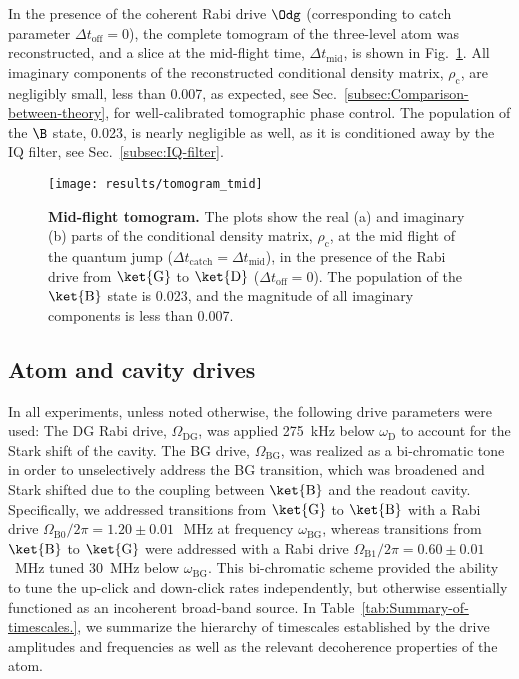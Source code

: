 In the presence of the coherent Rabi drive $\Odg$ (corresponding
to catch parameter $\Delta t_{\mathrm{off}}=0$), the complete tomogram
of the three-level atom was reconstructed, and a slice at the mid-flight
time, $\Delta t_{\mathrm{mid}}$, is shown in Fig.~\ref{fig:tomo_tmid}.
All imaginary components of the reconstructed conditional density
matrix, $\rho_{\mathrm{c}}$, are negligibly small, less than 0.007,
as expected, see Sec.~\ref{subsec:Comparison-between-theory}, for
well-calibrated tomographic phase control. The population of the $\B$
state, 0.023, is nearly negligible as well, as it is conditioned away
by the IQ filter, see Sec.~\ref{subsec:IQ-filter}.
\begin{figure}
\centering{}\texttt{[image: results/tomogram\_tmid]}
\caption[Mid-flight tomogram]{\label{fig:tomo_tmid}\textbf{Mid-flight tomogram. }The plots show
the real (a) and imaginary (b) parts of the conditional density matrix,
$\rho_{\mathrm{c}}$, at the mid flight of the quantum jump ($\Delta t_{\mathrm{catch}}=\Delta t_{\mathrm{mid}}$),
in the presence of the Rabi drive from $\ket{\mathrm{G}}$ to $\ket{\mathrm{D}}$
($\Delta t_{\mathrm{off}}=0$). The population of the $\ket{\mathrm{B}}$
state is 0.023, and the magnitude of all imaginary components is less
than 0.007. }
\end{figure}


\subsection{Atom and cavity drives \label{subsec:Atom-and-cavity}}

In all experiments, unless noted otherwise, the following drive parameters
were used: The DG Rabi drive, $\Omega_{\mathrm{DG}}$, was applied
275~kHz below $\omega_{\mathrm{D}}$ to account for the Stark shift
of the cavity. The BG drive, $\Omega_{\mathrm{BG}}$, was realized
as a bi-chromatic tone in order to unselectively address the BG transition,
which was broadened and Stark shifted due to the coupling between
$\ket{\mathrm{B}}$ and the readout cavity. Specifically, we addressed
transitions from $\ket{\mathrm{G}}$ to $\ket{\mathrm{B}}$ with a
Rabi drive $\Omega_{\mathrm{B0}}/2\pi=1.20\pm0.01\,$~MHz at frequency
$\omega_{\mathrm{BG}}$, whereas transitions from $\ket{\mathrm{B}}$
to $\ket{\mathrm{G}}$ were addressed with a Rabi drive $\Omega_{\mathrm{B1}}/2\pi=0.60\pm0.01\,$~MHz
tuned 30~MHz below $\omega_{\mathrm{BG}}$. This bi-chromatic scheme
provided the ability to tune the up-click and down-click rates independently,
but otherwise essentially functioned as an incoherent broad-band source.
In Table~\ref{tab:Summary-of-timescales.}, we summarize the hierarchy
of timescales established by the drive amplitudes and frequencies
as well as the relevant decoherence properties of the atom.

